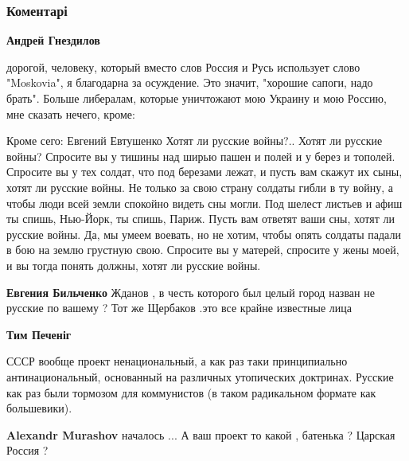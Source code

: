  
 
 
 
 
\subsubsection{Коментарі}
\label{sec:18_11_2021.fb.bilchenko_evgenia.1.gorod.cmt}

\begin{itemize} %
\textbf{Андрей Гнездилов} 

дорогой, человеку, который вместо слов Россия и Русь использует слово
"Moskovia", я благодарна за осуждение. Это значит, "хорошие сапоги, надо
брать". Больше либералам, которые уничтожают мою Украину и мою Россию, мне
сказать нечего, кроме:


\obeycr
Кроме сего: Евгений Евтушенко
Хотят ли русские войны?..
Хотят ли русские войны?
Спросите вы у тишины
над ширью пашен и полей
и у берез и тополей.
Спросите вы у тех солдат,
что под березами лежат,
и пусть вам скажут их сыны,
хотят ли русские войны.
Не только за свою страну
солдаты гибли в ту войну,
а чтобы люди всей земли
спокойно видеть сны могли.
Под шелест листьев и афиш
ты спишь, Нью-Йорк, ты спишь, Париж.
Пусть вам ответят ваши сны,
хотят ли русские войны.
Да, мы умеем воевать,
но не хотим, чтобы опять
солдаты падали в бою
на землю грустную свою.
Спросите вы у матерей,
спросите у жены моей,
и вы тогда понять должны,
хотят ли русские войны.
\restorecr

\begin{itemize} %
\textbf{Евгения Бильченко} Жданов , в честь которого был целый город назван не русские по вашему ? Тот же Щербаков .это все крайне известные лица

\textbf{Тим Печеніг} 

СССР вообще проект ненациональный, а как раз таки принципиально
антинациональный, основанный на различных утопических доктринах. Русские как раз
были тормозом для коммунистов (в таком радикальном формате как большевики).


\textbf{Alexandr Murashov} началось ... А ваш проект то какой , батенька ? Царская Россия ?


\end{itemize}
\end{itemize}
